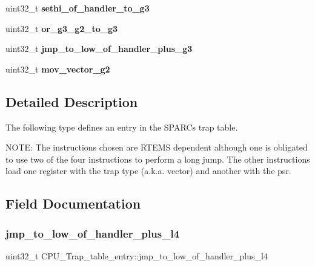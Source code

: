 \begin{DoxyCompactItemize}
\mbox{\label{structCPU__Trap__table__entry_ad2afdcbd51a8bc78b0a1ca7bb19dc5e3}} 
uint32\+\_\+t {\bfseries sethi\+\_\+of\+\_\+handler\+\_\+to\+\_\+g3}
\item 
\mbox{\label{structCPU__Trap__table__entry_af8b16d62e8f8df4655c7d71f4ed73af8}} 
uint32\+\_\+t {\bfseries or\+\_\+g3\+\_\+g2\+\_\+to\+\_\+g3}
\item 
\mbox{\label{structCPU__Trap__table__entry_a20c757f635a7e829988883b320091f89}} 
uint32\+\_\+t {\bfseries jmp\+\_\+to\+\_\+low\+\_\+of\+\_\+handler\+\_\+plus\+\_\+g3}
\item 
\mbox{\label{structCPU__Trap__table__entry_ad728d5a3e021ac0ffb80d75435b30814}} 
uint32\+\_\+t {\bfseries mov\+\_\+vector\+\_\+g2}
\end{DoxyCompactItemize}


\subsection{Detailed Description}
The following type defines an entry in the S\+P\+A\+RC\textquotesingle{}s trap table.

N\+O\+TE\+: The instructions chosen are R\+T\+E\+MS dependent although one is obligated to use two of the four instructions to perform a long jump. The other instructions load one register with the trap type (a.\+k.\+a. vector) and another with the psr. 

\subsection{Field Documentation}
\mbox{\label{structCPU__Trap__table__entry_ae8287de69b4c1f4d2461f5e4789c0697}} 
\subsubsection{\texorpdfstring{jmp\_to\_low\_of\_handler\_plus\_l4}{jmp\_to\_low\_of\_handler\_plus\_l4}}
{\footnotesize\ttfamily uint32\+\_\+t C\+P\+U\+\_\+\+Trap\+\_\+table\+\_\+entry\+::jmp\+\_\+to\+\_\+low\+\_\+of\+\_\+handler\+\_\+plus\+\_\+l4}


